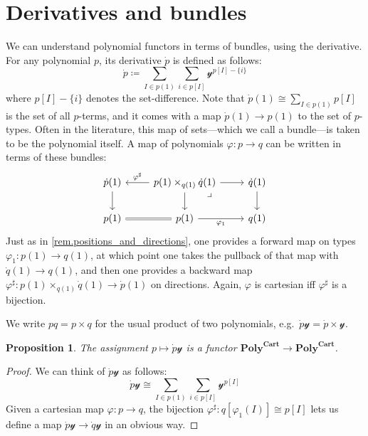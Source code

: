 \documentclass[11pt, one side, article]{memoir}
\theoremstyle{definition}
\theoremstyle{plain}
\newtheorem{proposition}[definitionx]{Proposition}
\newcommand{\Cat}[1]{\mathbf{#1}}%
\newcommand{\yon}{\mathcal{y}}
\newcommand{\poly}{\Cat{Poly}}
\newcommand{\polycart}{\poly^{\Cat{Cart}}}
\newcommand{\0}{\textsf{0}}
\newcommand{\1}{\tn{\textsf{1}}}
\begin{document}
\section{Derivatives and bundles}

We can understand polynomial functors in terms of bundles, using the derivative. For any polynomial $p$, its derivative $\dot{p}$ is defined as follows:
\begin{equation}\label{eqn.dotp}
\dot{p}\coloneqq\sum_{I\in p(1)}\sum_{i\in p[I]}\yon^{p[I]-\{i\}}
\end{equation}
where $p[I]-\{i\}$ denotes the set-difference. Note that $\dot{p}(1)\cong\sum_{I\in p(1)}p[I]$ is the set of all $p$-terms, and it comes with a map $\dot{p}(1)\to p(1)$ to the set of $p$-types. Often in the literature, this map of sets---which we call a bundle---is taken to be the polynomial itself. A map of polynomials $\varphi\colon p\to q$ can be written in terms of these bundles:
\[
\begin{tikzcd}
	\dot{p}(1)\ar[d]&p(1)\times_{q(1)}\dot{q}(1)\ar[l, "\varphi^\sharp"']\ar[r]\ar[d]&\dot{q}(1)\ar[d]\\
	p(1)\ar[r, equal]&p(1)\ar[r, "\varphi_1"']&q(1)\ar[ul, phantom, very near end, "\lrcorner"]
\end{tikzcd}
\]
Just as in \cref{rem.positions_and_directions}, one provides a forward map on types $\varphi_1\colon p(1)\to q(1)$, at which point one takes the pullback of that map with $\dot{q}(1)\to q(1)$, and then one provides a backward map $\varphi^\sharp\colon p(1)\times_{q(1)}\dot{q}(1)\to \dot{p}(1)$ on directions.
Again, $\varphi$ is cartesian iff $\varphi^\sharp$ is a bijection.

We write $pq=p\times q$ for the usual product of two polynomials, e.g.\ $\dot{p}\yon=\dot{p}\times\yon$.

\begin{proposition}\label{prop.dotpy}
The assignment $p\mapsto\dot{p}\yon$ is a functor $\polycart\to\polycart$.
\end{proposition}
\begin{proof}
We can think of $\dot{p}\yon$ as follows:
\begin{equation}\label{eqn.derivy}
\dot{p}\yon\cong\sum_{I\in p(1)}\sum_{i\in p[I]}\yon^{p[I]}
\end{equation}
Given a cartesian map $\varphi\colon p\to q$, the bijection $\varphi^\sharp\colon q[\varphi_1(I)]\cong p[I]$ lets us define a map $\dot{p}\yon\to\dot{q}\yon$ in an obvious way. 
\end{proof}
\end{document}

